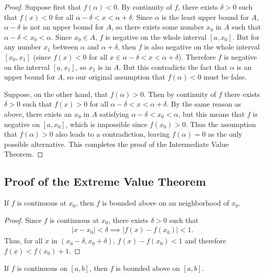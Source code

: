 \documentclass[12pt,letterpaper,reqno]{article}
\numberwithin{equation}{section}
\begin{document}
{\begin{proof}
	Suppose first that $f(\alpha)<0$. By continuity of $f$, there exists $\delta>0$ such that $f(x)<0$ for all $\alpha-\delta<x<\alpha+\delta$. Since $\alpha$ is the least upper bound for $A$, $\alpha-\delta$ is not an upper bound for $A$, so there exists some number $x_0$ in $A$ such that $\alpha-\delta<x_0<\alpha$. Since $x_0 \in A$, $f$ is negative on the whole interval $[a,x_0]$. But for any number $x_1$ between $\alpha$ and $\alpha+\delta$, then $f$ is also negative on the whole interval $[x_0,x_1]$ (since $f(x)<0$ for all $x \in \alpha-\delta<x<\alpha+\delta$). Therefore $f$ is negative on the interval $[a,x_1]$, so $x_1$ is in $A$. But this contradicts the fact that $\alpha$ is an upper bound for $A$, so our original assumption that $f(\alpha)<0$ must be false.
	
	Suppose, on the other hand, that $f(\alpha)>0$. Then by continuity of $f$ there exists $\delta>0$ such that $f(x)>0$ for all $\alpha-\delta<x<\alpha+\delta$. By the same reason as above, there exists an $x_0$ in $A$ satisfying $\alpha-\delta<x_0<\alpha$, but this means that $f$ is negative on $[a,x_0]$, which is impossible since $f(x_0)>0$. Thus the assumption that $f(\alpha)>0$ also leads to a contradiction, leaving $f(\alpha)=0$ as the only possible alternative. This completes the proof of the Intermediate Value Theorem.
\end{proof}

\subsection{Proof of the Extreme Value Theorem}
\begin{lem}
If $f$ is continuous at $x_0$, then $f$ is bounded above on an neighborhood of $x_0$.	
\end{lem}

\begin{proof}
	Since $f$ is continuous at $x_0$, there exists $\delta>0$ such that
	\begin{align*}
		|x-x_0|<\delta \implies |f(x)-f(x_0)|<1.
	\end{align*}
	Thus, for all $x$ in $(x_0-\delta,x_0+\delta)$, $f(x)-f(x_0)<1$ and therefore $f(x)<f(x_0)+1$.
\end{proof}

\begin{thm}
If $f$ is continuous on $[a,b]$, then $f$ is bounded above on $[a,b]$.	
\end{thm}

}
\end{document}
